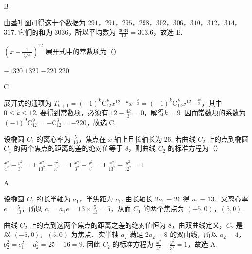 \begin{answer}
B
\end{answer}

\begin{solution}
由茎叶图可得这十个数据为 \(291\)，\(291\)，\(295\)，\(298\)，\(302\)，\(306\)，\(310\)，\(312\)，\(314\)，\(317\). 它们的和为 \(3036\)，所以平均数为 \(\frac{3036}{10}=303.6\)，故选 B.
\end{solution}

\begin{problem}
\(\left(x - \frac{1}{\sqrt[3]{x}}\right)^{12}\) 展开式中的常数项为（\quad）

\choices
    {\(-1320\)}
    {\(1320\)}
    {\(-220\)}
    {\(220\)}
\end{problem}

\begin{answer}
C
\end{answer}

\begin{solution}
展开式的通项为
\(T_{k+1}=(-1)^k\mathrm C_{12}^{k}x^{12-k}x^{-\frac{k}{3}}=(-1)^k\mathrm C_{12}^{k}x^{12-\frac{4k}{3}}\)，其中\(0\leqslant k\leqslant12\). 要得到常数项，必须有
\(12-\frac{4k}{3}=0\)，解得\(k=9\). 因而常数项的系数为
\((-1)^9\mathrm C_{12}^{9}=-\mathrm C_{12}^{3}=-220\)，故选 C.
\end{solution}

\begin{problem}
设椭圆 \(C_1\) 的离心率为 \(\frac{5}{13}\)，焦点在 \(x\) 轴上且长轴长为 26. 若曲线 \(C_2\) 上的点到椭圆 \(C_1\) 的两个焦点的距离的差的绝对值等于 8，则曲线 \(C_2\) 的标准方程为（\quad）

\choices
    {\(\frac{x^2}{4^2} - \frac{y^2}{3^2} = 1\)}
    {\(\frac{x^2}{13^2} - \frac{y^2}{5^2} = 1\)}
    {\(\frac{x^2}{3^2} - \frac{y^2}{4^2} = 1\)}
    {\(\frac{x^2}{13^2} - \frac{y^2}{12^2} = 1\)}
\end{problem}

\begin{answer}
A
\end{answer}

\begin{solution}
设椭圆 \(C_1\) 的长半轴为 \(a_1\)，半焦距为 \(c_1\). 由长轴长 \(2a_1=26\) 得 \(a_1=13\)，又离心率 \(e=\frac{5}{13}\)，所以 \(c_1=a_1e=13\times\frac{5}{13}=5\)，从而 \(C_1\) 的两个焦点为 \((-5,0)\)，\((5,0)\).

曲线 \(C_2\) 上的点到这两个焦点的距离之差的绝对值恒为 \(8\)，由双曲线定义，\(C_2\) 是以 \((-5,0)\)，\((5,0)\) 为焦点、实半轴 \(a_2\) 满足 \(2a_2=8\) 的双曲线，所以 \(a_2=4\)，\(b_2^2=c_1^2-a_2^2=25-16=9\). 因此 \(C_2\) 的标准方程为 \(\frac{x^2}{4^2}-\frac{y^2}{3^2}=1\)，故选 A.
\end{solution}

